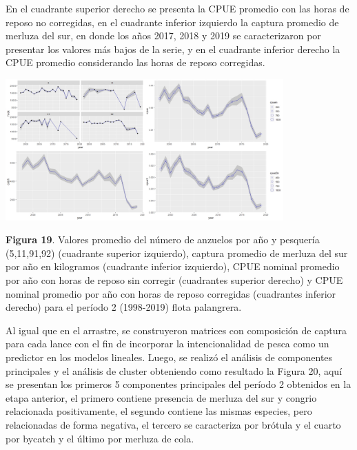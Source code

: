 \documentclass[
  spanish,
]{article}
\begin{document}
En el cuadrante superior derecho se presenta la CPUE promedio con las
horas de reposo no corregidas, en el cuadrante inferior izquierdo la
captura promedio de merluza del sur, en donde los años 2017, 2018 y 2019
se caracterizaron por presentar los valores más bajos de la serie, y en
el cuadrante inferior derecho la CPUE promedio considerando las horas de
reposo corregidas.

\begin{center}
\includegraphics[width=0.8\textwidth]{Figuras/Figura_19.png}
\end{center}

\small \textbf{Figura 19}. Valores promedio del número de anzuelos por
año y pesquería (5,11,91,92) (cuadrante superior izquierdo), captura
promedio de merluza del sur por año en kilogramos (cuadrante inferior
izquierdo), CPUE nominal promedio por año con horas de reposo sin
corregir (cuadrantes superior derecho) y CPUE nominal promedio por año
con horas de reposo corregidas (cuadrantes inferior derecho) para el
período 2 (1998-2019) flota palangrera. \vspace{0.5cm} \normalsize 

Al igual que en el arrastre, se construyeron matrices con composición de
captura para cada lance con el fin de incorporar la intencionalidad de
pesca como un predictor en los modelos lineales. Luego, se realizó el
análisis de componentes principales y el análisis de cluster obteniendo
como resultado la Figura 20, aquí se presentan los primeros 5
componentes principales del período 2 obtenidos en la etapa anterior, el
primero contiene presencia de merluza del sur y congrio relacionada
positivamente, el segundo contiene las mismas especies, pero
relacionadas de forma negativa, el tercero se caracteriza por brótula y
el cuarto por bycatch y el último por merluza de cola.
\end{document}
